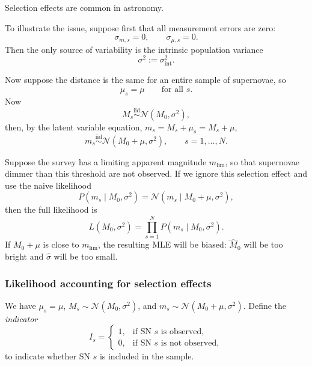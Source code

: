 \documentclass[11pt, titlepage]{article} %
\numberwithin{equation}{section}
\theoremstyle{definition}
\numberwithin{assumption}{section}
\begin{document}
Selection effects are common in astronomy.

To illustrate the issue, suppose first that all measurement errors are zero:
\begin{equation*}
    \sigma_{m,s}=0,
    \qquad
    \sigma_{\mu,s}=0.
\end{equation*}
Then the only source of variability is the intrinsic population variance
\begin{equation*}
    \sigma^2:=\sigma_{\mathrm{int}}^2.
\end{equation*}

Now suppose the distance is the same for an entire sample of supernovae, so
\begin{equation*}
    \mu_s=\mu
    \qquad \text{for all } s.
\end{equation*}
Now
\begin{equation*}
    M_s \overset{\mathrm{iid}}{\sim} \mathcal{N}(M_0,\sigma^2),
\end{equation*}
then, by the latent variable equation, $m_s=M_s+\mu_s=M_s+\mu$,
\begin{equation*}
    m_s \overset{\mathrm{iid}}{\sim} \mathcal{N}(M_0+\mu,\sigma^2),
    \qquad s=1,\dots,N.
\end{equation*}

Suppose the survey has a limiting apparent magnitude $m_{\mathrm{lim}}$, so that supernovae dimmer than this threshold are not observed. If we ignore this selection effect and use the naive likelihood
\begin{equation*}
    P(m_s\mid M_0,\sigma^2)=\mathcal{N}(m_s\mid M_0+\mu,\sigma^2),
\end{equation*}
then the full likelihood is
\begin{equation*}
    L(M_0,\sigma^2)=\prod_{s=1}^N P(m_s\mid M_0,\sigma^2).
\end{equation*}
If $M_0+\mu$ is close to $m_{\mathrm{lim}}$, the resulting MLE will be biased: $\hat M_0$ will be too bright and $\hat \sigma$ will be too small.


\subsubsection*{Likelihood accounting for selection effects}
We have $\mu_s=\mu$, $M_s\sim\mathcal{N}(M_0,\sigma^2)$, and $m_s\sim\mathcal{N}(M_0+\mu,\sigma^2)$. Define the \textit{indicator}
\begin{equation*}
    I_s=
    \begin{cases}
        1, & \text{if SN } s \text{ is observed},\\
        0, & \text{if SN } s \text{ is not observed},
    \end{cases}
\end{equation*}
to indicate whether SN $s$ is included in the sample.
\end{document}
